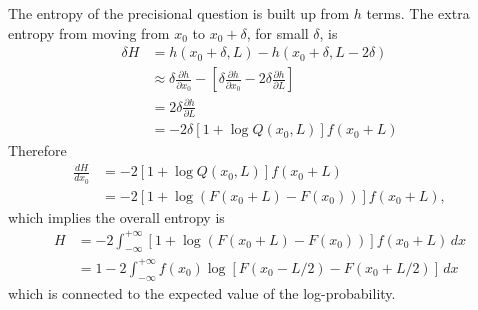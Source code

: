 \documentclass[entropy,article,accept,oneauthor,pdftex,10pt,a4paper]{mdpi}
\begin{document}
The entropy of the precisional question is built up from
$h$ terms. The extra entropy from moving from $x_0$ to
$x_0 + \delta$, for small $\delta$, is
\begin{align}
\delta H &= h(x_0 + \delta, L) - h(x_0 + \delta, L - 2\delta) \\
 &\approx \delta \frac{\partial h}{\partial x_0}
    - \left[\delta \frac{\partial h}{\partial x_0}
            -2\delta \frac{\partial h}{\partial L}\right] \\
 &= 2\delta \frac{\partial h}{\partial L} \\
 &= -2\delta\left[1 + \log Q(x_0, L)\right]f(x_0 + L)
\end{align}
Therefore
\begin{align}
\frac{dH}{dx_0} &= -2\left[1 + \log Q(x_0, L)\right]f(x_0 + L) \\
  &= -2\left[1 + \log \left(F(x_0 + L) - F(x_0)\right)\right]f(x_0 + L),
\end{align}
which implies the overall entropy is
\begin{align}
H &= -2\int_{-\infty}^{+\infty} \left[1 + \log \left(F(x_0 + L) - F(x_0)\right)\right]f(x_0 + L) \, dx \\
  &= 1-2\int_{-\infty}^{+\infty} f(x_0)\log \left[F(x_0-L/2) - F(x_0+L/2)\right] \, dx
\end{align}
which is connected to the expected value of the log-probability.


%

\end{document}
